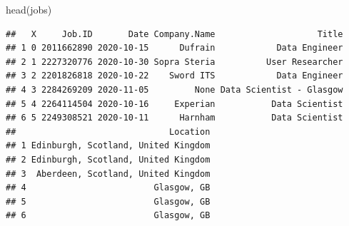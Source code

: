 \documentclass[
]{article}
\newenvironment{Shaded}{\begin{snugshade}}{\end{snugshade}}
\newcommand{\KeywordTok}[1]{\textcolor[rgb]{0.94,0.87,0.69}{#1}}
\newcommand{\NormalTok}[1]{\textcolor[rgb]{0.80,0.80,0.80}{#1}}
\begin{document}
\begin{Shaded}
\begin{Highlighting}[]
\KeywordTok{head}\NormalTok{(jobs)}
\end{Highlighting}
\end{Shaded}

\begin{verbatim}
##   X     Job.ID       Date Company.Name                    Title
## 1 0 2011662890 2020-10-15      Dufrain            Data Engineer
## 2 1 2227320776 2020-10-30 Sopra Steria          User Researcher
## 3 2 2201826818 2020-10-22    Sword ITS            Data Engineer
## 4 3 2284269209 2020-11-05         None Data Scientist - Glasgow
## 5 4 2264114504 2020-10-16     Experian           Data Scientist
## 6 5 2249308521 2020-10-11      Harnham           Data Scientist
##                              Location
## 1 Edinburgh, Scotland, United Kingdom
## 2 Edinburgh, Scotland, United Kingdom
## 3  Aberdeen, Scotland, United Kingdom
## 4                         Glasgow, GB
## 5                         Glasgow, GB
## 6                         Glasgow, GB

\end{verbatim}
\end{document}

